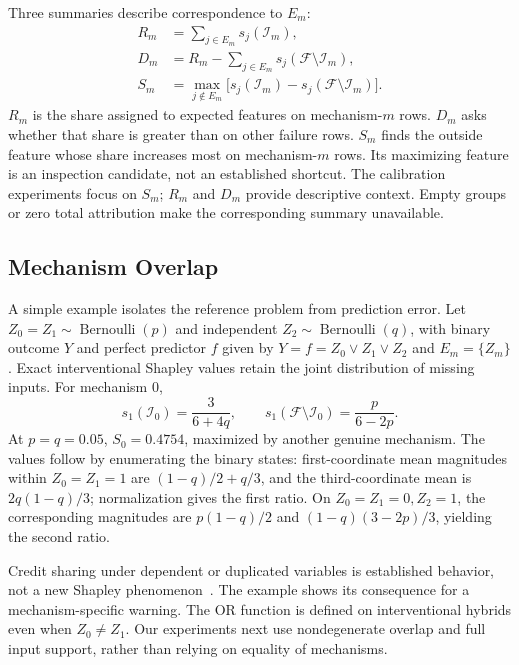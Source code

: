 \documentclass[conference]{IEEEtran}
\begin{document}
Three summaries describe correspondence to $E_m$:
\begin{align}
 R_m&=\sum_{j\in E_m}s_j(\mathcal I_m),\label{eq:relevance}\\
 D_m&=R_m-\sum_{j\in E_m}s_j(\mathcal F\setminus\mathcal I_m),\label{eq:specificity}\\
 S_m&=\max_{j\notin E_m}\bigl[s_j(\mathcal I_m)-s_j(\mathcal F\setminus\mathcal I_m)\bigr].\label{eq:outside}
\end{align}
$R_m$ is the share assigned to expected features on mechanism-$m$ rows. $D_m$ asks whether that share is greater than on other failure rows. $S_m$ finds the outside feature whose share increases most on mechanism-$m$ rows. Its maximizing feature is an inspection candidate, not an established shortcut. The calibration experiments focus on $S_m$; $R_m$ and $D_m$ provide descriptive context. Empty groups or zero total attribution make the corresponding summary unavailable.

\subsection{Mechanism Overlap}
A simple example isolates the reference problem from prediction error. Let $Z_0=Z_1\sim\operatorname{Bernoulli}(p)$ and independent $Z_2\sim\operatorname{Bernoulli}(q)$, with binary outcome $Y$ and perfect predictor $f$ given by $Y=f=Z_0\lor Z_1\lor Z_2$ and $E_m=\{Z_m\}$. Exact interventional Shapley values retain the joint distribution of missing inputs. For mechanism 0,
\begin{equation}
 s_1(\mathcal I_0)=\frac{3}{6+4q},\qquad
 s_1(\mathcal F\setminus\mathcal I_0)=\frac{p}{6-2p}.
\end{equation}
At $p=q=0.05$, $S_0=0.4754$, maximized by another genuine mechanism. The values follow by enumerating the binary states: first-coordinate mean magnitudes within $Z_0=Z_1=1$ are $(1-q)/2+q/3$, and the third-coordinate mean is $2q(1-q)/3$; normalization gives the first ratio. On $Z_0=Z_1=0,Z_2=1$, the corresponding magnitudes are $p(1-q)/2$ and $(1-q)(3-2p)/3$, yielding the second ratio.

Credit sharing under dependent or duplicated variables is established behavior, not a new Shapley phenomenon~\cite{janzing2020feature,kumar2020problems}. The example shows its consequence for a mechanism-specific warning. The OR function is defined on interventional hybrids even when $Z_0\neq Z_1$. Our experiments next use nondegenerate overlap and full input support, rather than relying on equality of mechanisms.
\end{document}
